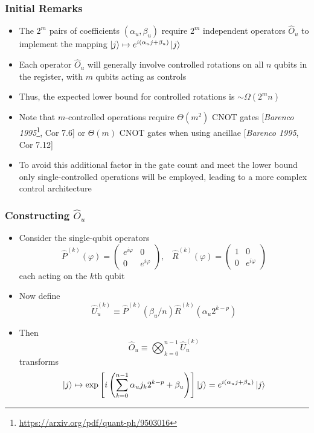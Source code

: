 \documentclass{beamer}
\begin{document}
\begin{frame}
\frametitle{Initial Remarks}
\begin{itemize}
\item The $2^m$ pairs of coefficients $(\alpha_u, \beta_u)$ require \alert{$2^m$ independent operators} $\hat{O}_u$ to implement the mapping $\ket{j} \mapsto e^{i (\alpha_u j + \beta_u)} \ket{j}$
\item Each operator $\hat{O}_u$ will generally involve \alert{controlled rotations} on all \alert{$n$ qubits} in the register, with \alert{$m$} qubits acting as \alert{controls}  
\item Thus, the expected lower bound for controlled rotations is \alert{$\sim \Omega (2^m n)$}
\item Note that \alert{$m$-controlled operations} require \alert{$\Theta(m^2)$} CNOT gates [\emph{Barenco 1995}\footnote{\url{https://arxiv.org/pdf/quant-ph/9503016}}, Cor 7.6] or \alert{$\Theta(m)$} CNOT gates when using ancillae [\emph{Barenco 1995}, Cor 7.12]
\item To avoid this additional factor in the gate count and meet the lower bound \alert{only single-controlled operations} will be employed, leading to a more complex control architecture 
\end{itemize}
\end{frame}

\begin{frame}
\frametitle{Constructing $\hat{O}_u$}
\begin{itemize}
\item Consider the single-qubit operators 
\begin{equation}
\hat{P}^{(k)}(\varphi) = \begin{pmatrix}
e^{i \varphi} & 0 \\ 0 & e^{i \varphi}
\end{pmatrix}, \; \; \; \hat{R}^{(k)}(\varphi) = \begin{pmatrix}
1 & 0 \\ 0 & e^{i \varphi}
\end{pmatrix}
\end{equation}
each acting on the $k$th qubit
\item Now define \alert{
\begin{equation}
\hat{U}^{(k)}_u \equiv \hat{P}^{(k)} (\beta_u /n ) \hat{R}^{(k)} (\alpha_u 2^{k-p})
\end{equation}}
\item Then \alert{
\begin{equation}
\hat{O}_u \equiv \bigotimes^{n-1}_{k=0} \hat{U}^{(k)}_u
\end{equation}}
transforms 
\begin{equation}
\ket{j} \mapsto \exp \left[ i \left( \sum_{k=0}^{n-1} \alpha_u j_k 2^{k-p} + \beta_u \right) \right] \ket{j} = e^{i (\alpha_u j + \beta_u )} \ket{j}
\end{equation}
\end{itemize}
\end{frame}
\end{document}
